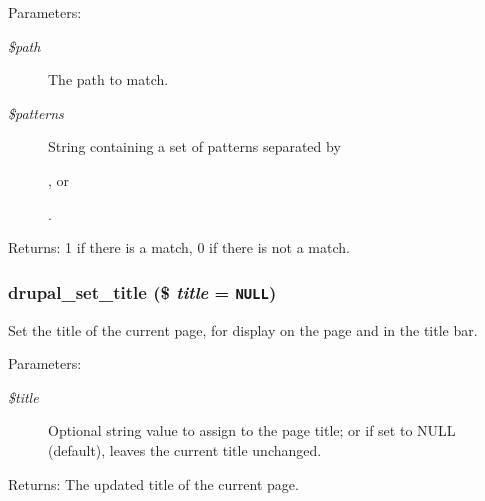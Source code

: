 \begin{Desc}
\item[Parameters:]
\begin{description}
\item[{\em \$path}]The path to match. \item[{\em \$patterns}]String containing a set of patterns separated by \par
,  or \par
.\end{description}
\end{Desc}
\begin{Desc}
\item[Returns:]1 if there is a match, 0 if there is not a match. \end{Desc}
\hypertarget{path_8inc_0594db78ce77c7d581a44d1337a45a41}{
\subsubsection[{drupal\_\-set\_\-title}]{\setlength{\rightskip}{0pt plus 5cm}drupal\_\-set\_\-title (\$ {\em title} = {\tt NULL})}}
\label{path_8inc_0594db78ce77c7d581a44d1337a45a41}


Set the title of the current page, for display on the page and in the title bar.

\begin{Desc}
\item[Parameters:]
\begin{description}
\item[{\em \$title}]Optional string value to assign to the page title; or if set to NULL (default), leaves the current title unchanged.\end{description}
\end{Desc}
\begin{Desc}
\item[Returns:]The updated title of the current page. \end{Desc}
